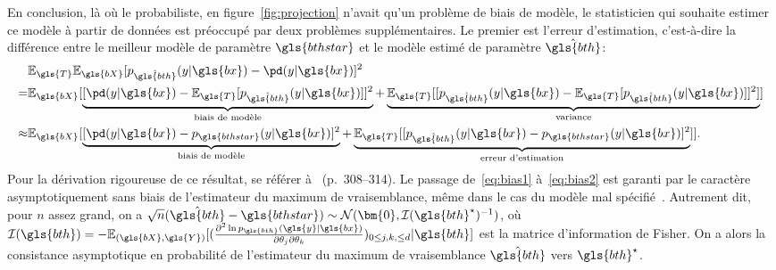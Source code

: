 En conclusion, là où le probabiliste, en figure~\ref{fig:projection} n'avait qu'un problème de biais de modèle, le statisticien qui souhaite estimer ce modèle à partir de données est préoccupé par deux problèmes supplémentaires. Le premier est l'erreur d'estimation, c'est-à-dire la différence entre le meilleur modèle de paramètre $\gls{bthstar}$ et le modèle estimé de paramètre $\hat{\gls{bth}}$:
\begin{align}
 & \mathbb{E}_{\gls{T}} \mathbb{E}_{\gls{bX}} [p_{\hat{\gls{bth}}}(y| \gls{bx}) - \pd(y| \gls{bx})]^2  \nonumber \\
= & \mathbb{E}_{\gls{bX}} [ \underbrace{[\pd(y| \gls{bx}) - \mathbb{E}_{\gls{T}} [ p_{\hat{\gls{bth}}}(y| \gls{bx})]]^2}_{\text{biais de modèle}} + \underbrace{\mathbb{E}_{\gls{T}} [[ p_{\hat{\gls{bth}}}(y| \gls{bx}) - \mathbb{E}_{\gls{T}} [ p_{\hat{\gls{bth}}}(y| \gls{bx}) ]]^2]}_{\text{variance}} ] \label{eq:bias1} \\
\approx & \mathbb{E}_{\gls{bX}} [ \underbrace{[\pd(y| \gls{bx}) - p_{\gls{bthstar}}(y| \gls{bx})]^2}_{\text{biais de modèle}} + \underbrace{\mathbb{E}_{\gls{T}} [[ p_{\hat{\gls{bth}}}(y| \gls{bx}) - p_{\gls{bthstar}}(y| \gls{bx})  ]^2}_{\text{erreur d'estimation}} ]]. \label{eq:bias2}
\end{align}
Pour la dérivation rigoureuse de ce résultat, se référer à~\cite{schutze2008introduction} (p.\ 308–314). Le passage de~\ref{eq:bias1} à~\ref{eq:bias2} est garanti par le caractère asymptotiquement sans biais de l'estimateur du maximum de vraisemblance, même dans le cas du modèle mal spécifié~\cite{white1982maximum}. Autrement dit, pour $n$ assez grand, on a $\sqrt{n} (\hat{\gls{bth}} - \gls{bthstar}) \sim \mathcal{N}(\bm{0} , \mathcal{I}(\gls{bth}^\star)^{-1})$, où $\mathcal{I}(\gls{bth}) = - \mathbb{E}_{(\gls{bX}, \gls{Y})}[ (\frac{\partial^2 \ln p_{\gls{bth}}(\gls{y} | \gls{bx})}{\partial \theta_j \partial \theta_k})_{0 \leq j,k, \leq d} | \gls{bth}]$ est la matrice d'information de Fisher. On a alors la consistance asymptotique en probabilité de l'estimateur du maximum de vraisemblance $\hat{\gls{bth}}$ vers $\gls{bth}^\star$.
